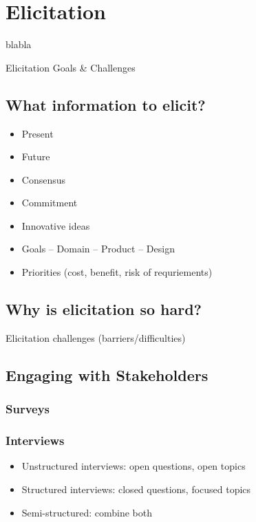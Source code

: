 
\chapter{Elicitation}%
blabla


Elicitation Goals \& Challenges%

\section{What information to elicit?}

\begin{itemize}
  \item Present
  \item Future 
  \item Consensus 
  \item Commitment 
  \item Innovative ideas
  \item Goals -- Domain -- Product -- Design
  \item Priorities (cost, benefit, risk of requriements)
\end{itemize}

\section{Why is elicitation so hard?}

Elicitation challenges (barriers/difficulties) 

\section{Engaging with Stakeholders}

\subsection{Surveys}

\subsection{Interviews}

\begin{itemize}
\item Unstructured interviews: open questions, open topics
\item Structured interviews: closed questions, focused topics
\item Semi-structured: combine both
\end{itemize}


